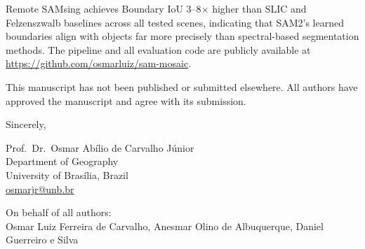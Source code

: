\documentclass[11pt]{article}
\begin{document}
Remote SAMsing achieves Boundary IoU 3--8$\times$ higher than SLIC and Felzenszwalb baselines across all tested scenes, indicating that SAM2's learned boundaries align with objects far more precisely than spectral-based segmentation methods. The pipeline and all evaluation code are publicly available at \url{https://github.com/osmarluiz/sam-mosaic}.

This manuscript has not been published or submitted elsewhere. All authors have approved the manuscript and agree with its submission.

\vspace{1cm}
\noindent Sincerely,

\vspace{0.8cm}
\noindent Prof.\ Dr.\ Osmar Ab\'{i}lio de Carvalho J\'{u}nior\\
Department of Geography\\
University of Bras\'{i}lia, Brazil\\
\href{mailto:osmarjr@unb.br}{osmarjr@unb.br}

\vspace{0.3cm}
\noindent On behalf of all authors:\\
Osmar Luiz Ferreira de Carvalho, Anesmar Olino de Albuquerque, Daniel Guerreiro e Silva
\end{document}
